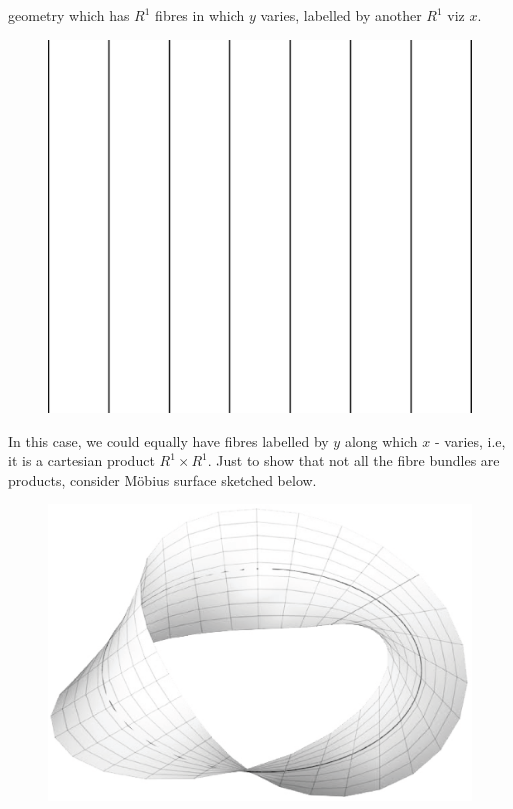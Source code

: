 geometry which has $R^1$ fibres in which $y$ varies, labelled by another $R^1$ viz $x$.
\begin{figure}[H]
\centering
\includegraphics[scale=0.1]{src/images/chap26/16.eps}
\end{figure}

In this case, we could equally have fibres labelled by $y$ along which $x$ - varies,
i.e, it is a cartesian product $R^1 \times R^1$. Just to show that not all the fibre bundles
are products, consider M\"{o}bius surface sketched below.
\begin{figure}[H]
\centering
\includegraphics[scale=0.2]{src/images/chap26/17.eps}
\end{figure}

